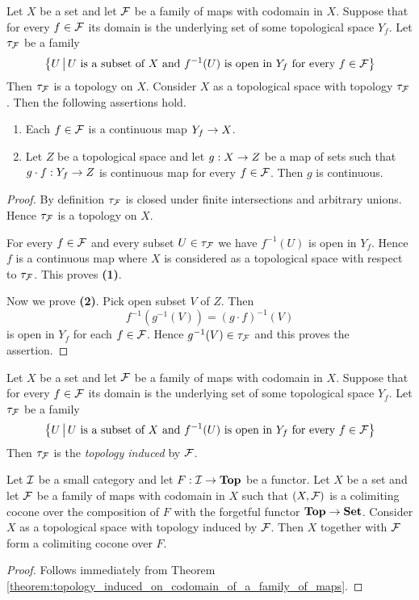 \begin{theorem}\label{theorem:topology_induced_on_codomain_of_a_family_of_maps}
	Let $X$ be a set and let ${\mathcal F}$ be a family of maps with codomain in $X$. Suppose that for every $f \in {\mathcal F}$ its domain is the underlying set of some topological space $Y_f$. Let $\tau_{{\mathcal F}}$ be a family
	$$\big\{U\,\big|\,U\mbox{ is a subset of }X\mbox{ and }f^{-1}(U)\mbox{ is open in }Y_f\mbox{ for every }f\in {\mathcal F}\big\}$$
	Then $\tau_{{\mathcal F}}$ is a topology on $X$. Consider $X$ as a topological space with topology $\tau_{{\mathcal F}}$. Then the following assertions hold.
	\begin{enumerate}[label=\emph{\textbf{(\arabic*)}}, leftmargin=3.0em]
		\item Each $f \in {\mathcal F}$ is a continuous map $Y_f \rightarrow X$.
		\item Let $Z$ be a topological space and let $g:X\rightarrow Z$ be a map of sets such that $g\cdot f:Y_f\rightarrow Z$ is continuous map for every $f \in {\mathcal F}$. Then $g$ is continuous.
	\end{enumerate}
\end{theorem}
\begin{proof}
	By definition $\tau_{{\mathcal F}}$ is closed under finite intersections and arbitrary unions. Hence $\tau_{{\mathcal F}}$ is a topology on $X$.

	For every $f \in {\mathcal F}$ and every subset $U \in \tau_{{\mathcal F}}$ we have $f^{-1}(U)$ is open in $Y_f$. Hence $f$ is a continuous map where $X$ is considered as a topological space with respect to $\tau_{{\mathcal F}}$. This proves \textbf{(1)}.

	Now we prove \textbf{(2)}. Pick open subset $V$ of $Z$. Then
	$$f^{-1}\left(g^{-1}(V)\right) = \left(g\cdot f\right)^{-1}(V)$$
	is open in $Y_f$ for each $f \in {\mathcal F}$. Hence $g^{-1}(V) \in \tau_{{\mathcal F}}$ and this proves the assertion.
\end{proof}

\begin{definition}
	Let $X$ be a set and let ${\mathcal F}$ be a family of maps with codomain in $X$. Suppose that for every $f \in {\mathcal F}$ its domain is the underlying set of some topological space $Y_f$. Let $\tau_{{\mathcal F}}$ be a family
	$$\big\{U\,\big|\,U\mbox{ is a subset of }X\mbox{ and }f^{-1}(U)\mbox{ is open in }Y_f\mbox{ for every }f\in {\mathcal F}\big\}$$
	Then $\tau_{{\mathcal F}}$ is the \textit{topology induced} by ${\mathcal F}$.
\end{definition}

\begin{corollary}\label{corollary:colimits_in_category_of_topological_spaces}
	Let ${\mathcal I}$ be a small category and let $F:{\mathcal I} \rightarrow \mathbf{Top}$ be a functor. Let $X$ be a set and let ${\mathcal F}$ be a family of maps with codomain in $X$ such that $(X,{\mathcal F})$ is a colimiting cocone over the composition of $F$ with the forgetful functor $\mathbf{Top} \rightarrow \mathbf{Set}$. Consider $X$ as a topological space with topology induced by ${\mathcal F}$. Then $X$ together with ${\mathcal F}$ form a colimiting cocone over $F$.
\end{corollary}
\begin{proof}
	Follows immediately from Theorem \ref{theorem:topology_induced_on_codomain_of_a_family_of_maps}.
\end{proof}

